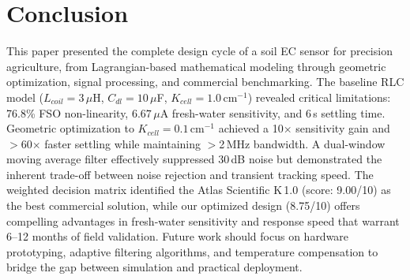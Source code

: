 \documentclass[conference]{IEEEtran}
\begin{document}
\section{Conclusion}
This paper presented the complete design cycle of a soil EC sensor for precision agriculture, from Lagrangian-based mathematical modeling through geometric optimization, signal processing, and commercial benchmarking. The baseline RLC model ($L_{coil} = 3\,\mu$H, $C_{dl} = 10\,\mu$F, $K_{cell} = 1.0\,\text{cm}^{-1}$) revealed critical limitations: 76.8\% FSO non-linearity, $6.67\,\mu$A fresh-water sensitivity, and 6\,s settling time. Geometric optimization to $K_{cell} = 0.1\,\text{cm}^{-1}$ achieved a 10$\times$ sensitivity gain and $>$60$\times$ faster settling while maintaining $>$2\,MHz bandwidth. A dual-window moving average filter effectively suppressed 30\,dB noise but demonstrated the inherent trade-off between noise rejection and transient tracking speed. The weighted decision matrix identified the Atlas Scientific K\,1.0 (score: 9.00/10) as the best commercial solution, while our optimized design (8.75/10) offers compelling advantages in fresh-water sensitivity and response speed that warrant 6--12 months of field validation. Future work should focus on hardware prototyping, adaptive filtering algorithms, and temperature compensation to bridge the gap between simulation and practical deployment.
\end{document}
